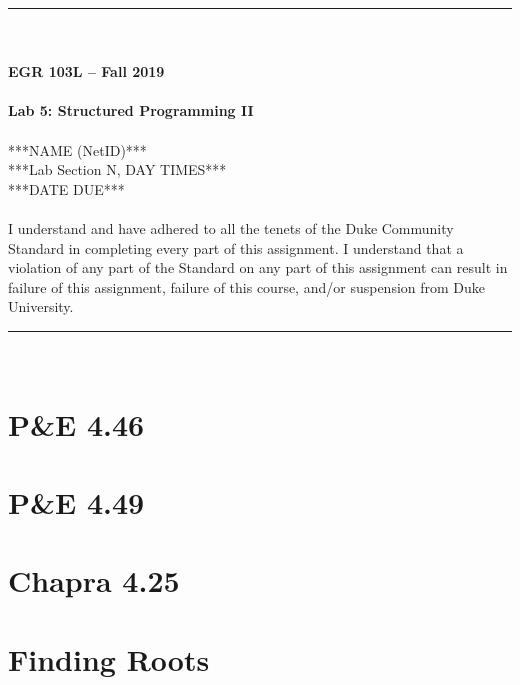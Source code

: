 \documentclass{article}
\begin{document}
\begin{center}
\rule{6.5in}{0.5mm}\\~\\
\textbf{\large EGR 103L -- Fall 2019}\\~\\
\textbf{\huge Lab 5: Structured Programming II}\\~\\
***NAME (NetID)***\\
***Lab Section N, DAY TIMES***\\
***DATE DUE***\\~\\
{\small I understand and have adhered to all the tenets of the Duke
  Community Standard in completing every part of this assignment.  I
  understand that a violation of any part of the Standard on any part
  of this assignment can result in failure of this assignment, failure
  of this course, and/or suspension from Duke University.} 
\rule{6.5in}{0.5mm}\\
\end{center}
\tableofcontents
\pagebreak

\section{P\&E 4.46}

\section{P\&E 4.49}

\section{Chapra 4.25}

\section{Finding Roots}

\pagebreak
\appendix
\end{document}
